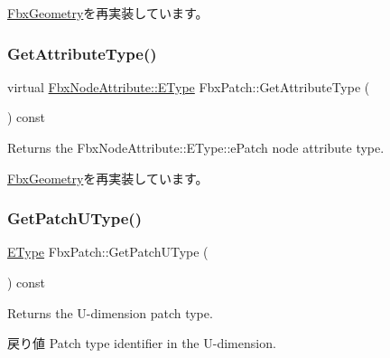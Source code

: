 \hyperlink{class_fbx_geometry_a07e94f7801067d66429afbf1799795cd}{Fbx\+Geometry}を再実装しています。

\mbox{\label{class_fbx_patch_a4eb7de708949e012e0dcae2cb87a2ef4}} 
\subsubsection{\texorpdfstring{Get\+Attribute\+Type()}{GetAttributeType()}}
{\footnotesize\ttfamily virtual \hyperlink{class_fbx_node_attribute_a08e1669d3d1a696910756ab17de56d6a}{Fbx\+Node\+Attribute\+::\+E\+Type} Fbx\+Patch\+::\+Get\+Attribute\+Type (\begin{DoxyParamCaption}{ }\end{DoxyParamCaption}) const\hspace{0.3cm}{\ttfamily [virtual]}}



Returns the Fbx\+Node\+Attribute\+::\+E\+Type\+::e\+Patch node attribute type. 



\hyperlink{class_fbx_geometry_a41ae23e5d0cf08693bca49737f333de9}{Fbx\+Geometry}を再実装しています。

\mbox{\label{class_fbx_patch_ab67355654d2257bffdd2a686b2da4096}} 
\subsubsection{\texorpdfstring{Get\+Patch\+U\+Type()}{GetPatchUType()}}
{\footnotesize\ttfamily \hyperlink{class_fbx_patch_ad669936e6b844a7a15fa30ec7c183fbb}{E\+Type} Fbx\+Patch\+::\+Get\+Patch\+U\+Type (\begin{DoxyParamCaption}{ }\end{DoxyParamCaption}) const}

Returns the U-\/dimension patch type. \begin{DoxyReturn}{戻り値}
Patch type identifier in the U-\/dimension. 
\end{DoxyReturn}
\mbox{\label{class_fbx_patch_ad3648b3dedde60e7b0c9d0691c96de42}} 

